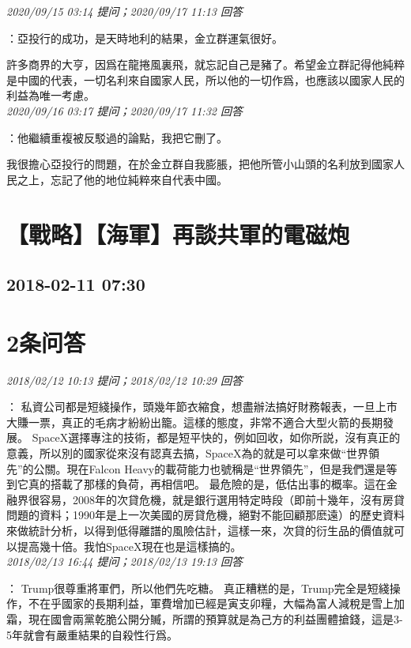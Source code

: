 \documentclass[twocolumn]{ctexart}
\begin{document}
\textit{\hfill\noindent\small 2020/09/15 03:14 提问；2020/09/17 11:13 回答}

：亞投行的成功，是天時地利的結果，金立群運氣很好。

許多商界的大亨，因爲在龍捲風裏飛，就忘記自己是豬了。希望金立群記得他純粹是中國的代表，一切名利來自國家人民，所以他的一切作爲，也應該以國家人民的利益為唯一考慮。
\\

\textit{\hfill\noindent\small 2020/09/16 03:17 提问；2020/09/17 11:32 回答}

：他繼續重複被反駁過的論點，我把它刪了。

我很擔心亞投行的問題，在於金立群自我膨脹，把他所管小山頭的名利放到國家人民之上，忘記了他的地位純粹來自代表中國。
\\


\section{【戰略】【海軍】再談共軍的電磁炮}
\subsection{2018-02-11 07:30}


\section{2条问答}

\textit{\hfill\noindent\small 2018/02/12 10:13 提问；2018/02/12 10:29 回答}

：
私資公司都是短綫操作，頭幾年節衣縮食，想盡辦法搞好財務報表，一旦上市大賺一票，真正的毛病才紛紛出籠。這樣的態度，非常不適合大型火箭的長期發展。
SpaceX選擇專注的技術，都是短平快的，例如回收，如你所説，沒有真正的意義，所以別的國家從來沒有認真去搞，SpaceX為的就是可以拿來做“世界領先”的公關。現在Falcon Heavy的載荷能力也號稱是“世界領先”，但是我們還是等到它真的搭載了那樣的負荷，再相信吧。
最危險的是，低估出事的概率。這在金融界很容易，2008年的次貸危機，就是銀行選用特定時段（即前十幾年，沒有房貸問題的資料；1990年是上一次美國的房貸危機，絕對不能回顧那麽遠）的歷史資料來做統計分析，以得到低得離譜的風險估計，這樣一來，次貸的衍生品的價值就可以提高幾十倍。我怕SpaceX現在也是這樣搞的。
\\

\textit{\hfill\noindent\small 2018/02/13 16:44 提问；2018/02/13 19:13 回答}

：
Trump很尊重將軍們，所以他們先吃糖。
真正糟糕的是，Trump完全是短綫操作，不在乎國家的長期利益，軍費增加已經是寅支卯糧，大幅為富人減稅是雪上加霜，現在國會兩黨乾脆公開分贓，所謂的預算就是為己方的利益團體搶錢，這是3-5年就會有嚴重結果的自殺性行爲。
\\
\end{document}
